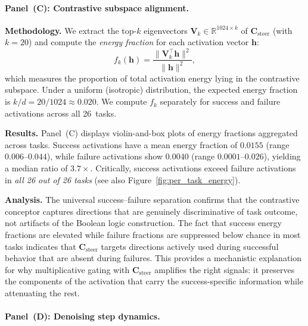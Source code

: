 \paragraph{Panel~(C): Contrastive subspace alignment.}

\textbf{Methodology.}
We extract the top-$k$ eigenvectors $\mathbf{V}_k \in \mathbb{R}^{1024 \times k}$ of $\mathbf{C}_{\mathrm{steer}}$ (with $k = 20$) and compute the \emph{energy fraction} for each activation vector $\mathbf{h}$:
\begin{equation}
    f_k(\mathbf{h}) = \frac{\|\mathbf{V}_k^\top \mathbf{h}\|^2}{\|\mathbf{h}\|^2},
\end{equation}
which measures the proportion of total activation energy lying in the contrastive subspace. Under a uniform (isotropic) distribution, the expected energy fraction is $k/d = 20/1024 \approx 0.020$. We compute $f_k$ separately for success and failure activations across all 26~tasks.

\textbf{Results.}
Panel~(C) displays violin-and-box plots of energy fractions aggregated across tasks. Success activations have a mean energy fraction of $0.0155$ (range $0.006$--$0.044$), while failure activations show $0.0040$ (range $0.0001$--$0.026$), yielding a median ratio of $3.7\times$. Critically, success activations exceed failure activations in \emph{all 26 out of 26 tasks} (see also Figure~\ref{fig:per_task_energy}).

\textbf{Analysis.}
The universal success--failure separation confirms that the contrastive conceptor captures directions that are genuinely discriminative of task outcome, not artifacts of the Boolean logic construction. The fact that success energy fractions are elevated while failure fractions are suppressed below chance in most tasks indicates that $\mathbf{C}_{\mathrm{steer}}$ targets directions actively used during successful behavior that are absent during failures. This provides a mechanistic explanation for why multiplicative gating with $\mathbf{C}_{\mathrm{steer}}$ amplifies the right signals: it preserves the components of the activation that carry the success-specific information while attenuating the rest.

\paragraph{Panel~(D): Denoising step dynamics.}

